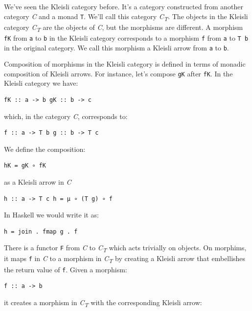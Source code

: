 We've seen the Kleisli category before. It's a category constructed from
another category \emph{C} and a monad \texttt{T}. We'll call this
category \emph{C\textsubscript{T}}. The objects in the Kleisli category
\emph{C\textsubscript{T}} are the objects of \emph{C}, but the morphisms
are different. A morphism \texttt{fK} from \texttt{a} to \texttt{b} in
the Kleisli category corresponds to a morphism \texttt{f} from
\texttt{a} to \texttt{T\ b} in the original category. We call this
morphism a Kleisli arrow from \texttt{a} to \texttt{b}.

Composition of morphisms in the Kleisli category is defined in terms of
monadic composition of Kleisli arrows. For instance, let's compose
\texttt{gK} after \texttt{fK}. In the Kleisli category we have:

\begin{verbatim}
fK :: a -> b gK :: b -> c
\end{verbatim}

which, in the category \emph{C}, corresponds to:

\begin{verbatim}
f :: a -> T b g :: b -> T c
\end{verbatim}

We define the composition:

\begin{verbatim}
hK = gK ∘ fK
\end{verbatim}

as a Kleisli arrow in \emph{C}

\begin{verbatim}
h :: a -> T c h = μ ∘ (T g) ∘ f
\end{verbatim}

In Haskell we would write it as:

\begin{verbatim}
h = join . fmap g . f
\end{verbatim}

There is a functor \texttt{F} from \emph{C} to \emph{C\textsubscript{T}}
which acts trivially on objects. On morphims, it maps \texttt{f} in
\emph{C} to a morphism in \emph{C\textsubscript{T}} by creating a
Kleisli arrow that embellishes the return value of \texttt{f}. Given a
morphism:

\begin{verbatim}
f :: a -> b
\end{verbatim}

it creates a morphism in \emph{C\textsubscript{T}} with the
corresponding Kleisli arrow:

